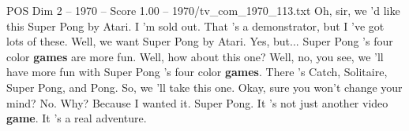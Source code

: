 \begin{textsample}{POS Dim 2 – 1970 – Score 1.00 – 1970/tv\_com\_1970\_113.txt}  \label{ex:f2_pos_058}
Oh, sir, we 'd like this Super Pong by Atari.
I 'm sold out.
That 's a demonstrator, but I 've got lots of these.
Well, we want Super Pong by Atari.
Yes, but...
Super Pong 's four color \textbf{games} are more fun.
Well, how about this one?
Well, no, you see, we 'll have more fun with Super Pong 's four color \textbf{games}.
There 's Catch, Solitaire, Super Pong, and Pong.
So, we 'll take this one.
Okay, sure you won't change your mind?
No.
Why?
Because I wanted it.
Super Pong.
It 's not just another video \textbf{game}.
It 's a real adventure.

\end{textsample}
